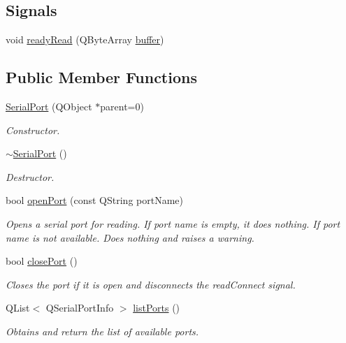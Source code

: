 \subsection*{Signals}
\begin{DoxyCompactItemize}
\item 
void \hyperlink{class_serial_port_a3ec0fe7fd001c56fb95e010da11817c0}{ready\-Read} (Q\-Byte\-Array \hyperlink{class_serial_port_af5ff5c504f070840bd28ee371f353f05}{buffer})
\end{DoxyCompactItemize}
\subsection*{Public Member Functions}
\begin{DoxyCompactItemize}
\item 
\hyperlink{class_serial_port_ae68e4a28e607b4acbab2c2a894cb3e2b}{Serial\-Port} (Q\-Object $\ast$parent=0)
\begin{DoxyCompactList}\small\item\em Constructor. \end{DoxyCompactList}\item 
\hyperlink{class_serial_port_a8e09f366ed9b26b0456b66ae7bd8c702}{$\sim$\-Serial\-Port} ()
\begin{DoxyCompactList}\small\item\em Destructor. \end{DoxyCompactList}\item 
bool \hyperlink{class_serial_port_a746e1ff02d45d8bf6b94e8bcbde6bb0d}{open\-Port} (const Q\-String port\-Name)
\begin{DoxyCompactList}\small\item\em Opens a serial port for reading. If port name is empty, it does nothing. If port name is not available. Does nothing and raises a warning. \end{DoxyCompactList}\item 
bool \hyperlink{class_serial_port_a71c52f501f57ab491d0dc83cbc5e6a14}{close\-Port} ()
\begin{DoxyCompactList}\small\item\em Closes the port if it is open and disconnects the read\-Connect signal. \end{DoxyCompactList}\item 
Q\-List$<$ Q\-Serial\-Port\-Info $>$ \hyperlink{class_serial_port_acd94c96dd2608f90a9ead0ced2742d17}{list\-Ports} ()
\begin{DoxyCompactList}\small\item\em Obtains and return the list of available ports. \end{DoxyCompactList}\end{DoxyCompactItemize}
